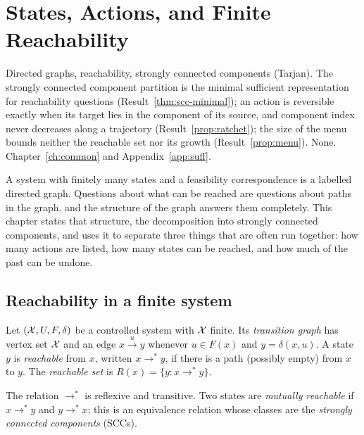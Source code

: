 \chapter{States, Actions, and Finite Reachability}\label{ch:reach}
{Directed graphs, reachability, strongly connected components (Tarjan).}
{The strongly connected component partition is the minimal sufficient representation for reachability questions (Result~\ref{thm:scc-minimal}); an action is reversible exactly when its target lies in the component of its source, and component index never decreases along a trajectory (Result~\ref{prop:ratchet}); the size of the menu bounds neither the reachable set nor its growth (Result~\ref{prop:menu}).}
{None.}
{Chapter~\ref{ch:common} and Appendix~\ref{app:suff}.}

A system with finitely many states and a feasibility correspondence is a labelled directed graph. Questions about what can be reached are questions about paths in the graph, and the structure of the graph answers them completely. This chapter states that structure, the decomposition into strongly connected components, and uses it to separate three things that are often run together: how many actions are listed, how many states can be reached, and how much of the past can be undone.

\section{Reachability in a finite system}

\begin{definition}\label{def:graph}
Let $(\mathcal{X},U,F,\delta)$ be a controlled system with $\mathcal{X}$ finite. Its \emph{transition graph} has vertex set $\mathcal{X}$ and an edge $x\xrightarrow{u}y$ whenever $u\in F(x)$ and $y=\delta(x,u)$. A state $y$ is \emph{reachable} from $x$, written $x\to^{*}y$, if there is a path (possibly empty) from $x$ to $y$. The \emph{reachable set} is $R(x)=\{y:x\to^{*}y\}$.
\end{definition}

The relation $\to^{*}$ is reflexive and transitive. Two states are \emph{mutually reachable} if $x\to^{*}y$ and $y\to^{*}x$; this is an equivalence relation whose classes are the \emph{strongly connected components} (SCCs).

